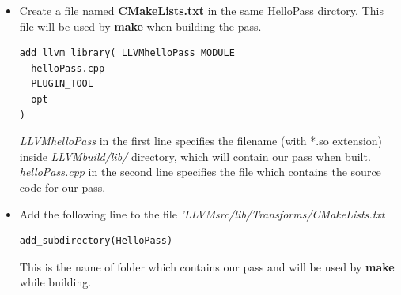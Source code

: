 \begin{itemize}
\begin{lstlisting}
    bool runOnFunction(Function &F) override {
      errs() << "Function Name: ";
      errs().write_escaped(F.getName()) << '\n';
      errs() << "===================================================\n";
      for(auto bb = F.begin(); bb != F.end(); bb++){
        errs() << "\tBasicBlock Name = " << bb->getName() << "\n";
        errs() << "\tBasicBlock Size = " << bb->size() << "\n";
        for(auto i = bb->begin(); i != bb->end(); i++){
          errs() << "\t" << "Instruction: " << *i << "\n";
          errs() << "\t" << "OpCode: " << i->getOpcode() << "\n";
          errs() << "\t" << "OpCodeName: " << i->getOpcodeName() << "\n";
          errs() << "\t" << "IsBinaryOp: " << i->isBinaryOp() << "\n";
          errs() << "\t" << "IsCommutative: " << i->isCommutative() << "\n";
          errs() << "\t" << "IsAssociative: " << i->isAssociative() << "\n";
        }
        errs() << "\n\n";
      } 
      return false;
    }
  };
}
char itrinstBB::ID = 0;
static RegisterPass<helloPass> X("hello", 
                                 "Iterates instructions in a function");
        \end{lstlisting}
        The above code contains a \textbf{function pass} - which means the 
        pass is run on every function defined in a file. Using 
        iterators it traverses each basic block of the function, and 
        for each basic block, it traverses each instruction and 
        prints the details of the instruction - like its opcode, 
        whether it is commutative and associative etc.\\
        \textbf{Important} - Notice the first argument \textbf{hello} 
        which is passed in the last line while registering the pass. 
        This argument will be passed as a flag to the 
        \textbf{HelloPass} pass when we want to run the function-pass 
        defined inside \textbf{helloPass} structure (the template 
        arguments in the last line).
    \item Create a file named \textbf{CMakeLists.txt} in the same 
    HelloPass dirctory. This file will be used by \textbf{make} when 
    building the pass.
        \begin{lstlisting}
add_llvm_library( LLVMhelloPass MODULE
  helloPass.cpp
  PLUGIN_TOOL
  opt
)
        \end{lstlisting}
        \textit{LLVMhelloPass} in the first line specifies the 
        filename (with *.so extension) inside \textit{LLVMbuild/lib/}
        directory, which will contain our pass when built. 
        \textit{helloPass.cpp} in the second line specifies the file 
        which contains the source code for our pass.
    \item Add the following line to the file 
    \textit{'LLVMsrc/lib/Transforms/CMakeLists.txt}
        \begin{lstlisting}
add_subdirectory(HelloPass)
        \end{lstlisting}
        This is the name of folder which contains our pass and will be used by \textbf{make} while building.

\end{itemize}

